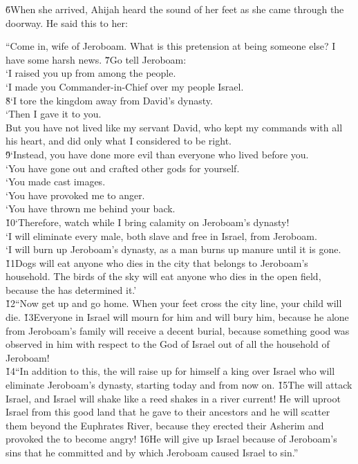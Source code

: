 \v{6}When she arrived, Ahijah heard the sound of her feet as she came through the doorway. He said this to her:

\begin{poetry}
\poeml ``Come in, wife of Jeroboam. What is this pretension at being someone else? I have some harsh news. \v{7}Go tell Jeroboam: \\
\poeml `I raised you up from among the people. \\
\poeml `I made you Commander-in-Chief over my people Israel. \\
\poeml \v{8}`I tore the kingdom away from David's dynasty. \\
\poeml `Then I gave it to you. \\
\poeml But you have not lived like my servant David, who kept my commands with all his heart, and did only what I considered to be right. \\
\poeml \v{9}`Instead, you have done more evil than everyone who lived before you. \\
\poeml `You have gone out and crafted other gods for yourself. \\
\poeml `You made cast images. \\
\poeml `You have provoked me to anger. \\
\poeml `You have thrown me behind your back. \\
\poeml \v{10}`Therefore, watch while I bring calamity on Jeroboam's dynasty! \\
\poeml `I will eliminate every male, both slave and free in Israel, from Jeroboam. \\
\poeml `I will burn up Jeroboam's dynasty, as a man burns up manure until it is gone. \v{11}Dogs will eat anyone who dies in the city that belongs to Jeroboam's household. The birds of the sky will eat anyone who dies in the open field, because the  has determined it.' \\
\poeml \v{12}``Now get up and go home. When your feet cross the city line, your child will die. \v{13}Everyone in Israel will mourn for him and will bury him, because he alone from Jeroboam's family will receive a decent burial, because something good was observed in him with respect to the  God of Israel out of all the household of Jeroboam! \\
\poeml \v{14}``In addition to this, the  will raise up for himself a king over Israel who will eliminate Jeroboam's dynasty, starting today and from now on. \v{15}The  will attack Israel, and Israel will shake like a reed shakes in a river current! He will uproot Israel from this good land that he gave to their ancestors and he will scatter them beyond the Euphrates River, because they erected their Asherim and provoked the  to become angry! \v{16}He will give up Israel because of Jeroboam's sins that he committed and by which Jeroboam caused Israel to sin.''

\end{poetry}
